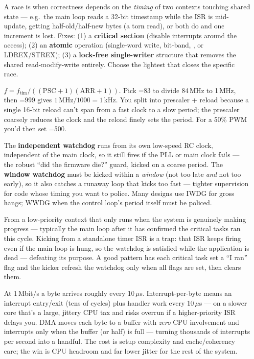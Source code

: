 A race is when correctness depends on the \emph{timing} of two contexts
touching shared state --- e.g.\ the main loop reads a 32-bit timestamp while the
ISR is mid-update, getting half-old/half-new bytes (a torn read), or both do
 and one increment is lost. Fixes: (1) a \textbf{critical section}
(disable interrupts around the access); (2) an \textbf{atomic} operation
(single-word write, bit-band, , or LDREX/STREX); (3) a
\textbf{lock-free single-writer} structure that removes the shared
read-modify-write entirely. Choose the lightest that closes the specific race.

$f = f_{\text{tim}}/((\text{PSC}+1)(\text{ARR}+1))$. Pick =83 to
divide 84\,MHz to 1\,MHz, then =999 gives
$1\,\text{MHz}/1000 = 1\,\text{kHz}$. You split into prescaler + reload because
a single 16-bit reload can't span from a fast clock to a slow period; the
prescaler coarsely reduces the clock and the reload finely sets the period.
For a 50\% PWM you'd then set =500.

The \textbf{independent watchdog} runs from its own low-speed RC clock,
independent of the main clock, so it still fires if the PLL or main clock fails
--- the robust ``did the firmware die?'' guard, kicked on a coarse period. The
\textbf{window watchdog} must be kicked within a \emph{window} (not too late
\emph{and} not too early), so it also catches a runaway loop that kicks too
fast --- tighter supervision for code whose timing you want to police. Many
designs use IWDG for gross hangs; WWDG when the control loop's period itself
must be policed.

From a low-priority context that only runs when the system is genuinely making
progress --- typically the main loop after it has confirmed the critical tasks
ran this cycle. Kicking from a standalone timer ISR is a trap: that ISR keeps
firing even if the main loop is hung, so the watchdog is satisfied while the
application is dead --- defeating its purpose. A good pattern has each critical
task set a ``I ran'' flag and the kicker refresh the watchdog only when all
flags are set, then clears them.

At 1\,Mbit/s a byte arrives roughly every 10\,$\mu$s. Interrupt-per-byte means
an interrupt entry/exit (tens of cycles) plus handler work every 10\,$\mu$s ---
on a slower core that's a large, jittery CPU tax and risks overrun if a
higher-priority ISR delays you. DMA moves each byte to a buffer with \emph{zero}
CPU involvement and interrupts only when the buffer (or half) is full ---
turning thousands of interrupts per second into a handful. The cost is setup
complexity and cache/coherency care; the win is CPU headroom and far lower
jitter for the rest of the system.

